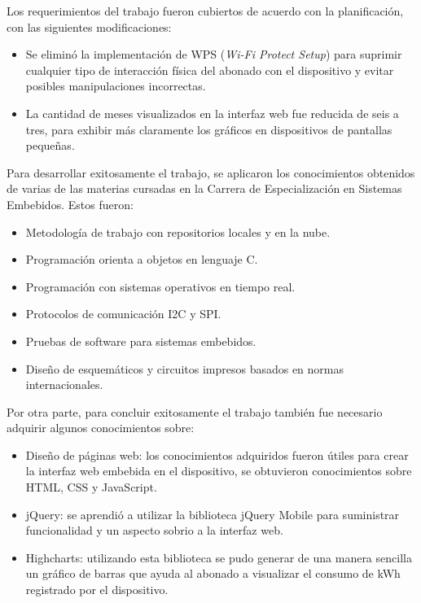 Los requerimientos del trabajo fueron cubiertos de acuerdo con la planificación, con las siguientes modificaciones:
\begin{itemize}
	\item Se eliminó la implementación de WPS (\textit{Wi-Fi Protect Setup}) para suprimir cualquier tipo de interacción física del abonado con el dispositivo y evitar posibles manipulaciones incorrectas.
	\item La cantidad de meses visualizados en la interfaz web fue reducida de seis a tres, para exhibir más claramente los gráficos en dispositivos de pantallas pequeñas.
\end{itemize}

Para desarrollar exitosamente el trabajo, se aplicaron los conocimientos obtenidos de varias de las materias cursadas en la Carrera de Especialización en Sistemas Embebidos. Estos fueron:

\begin{itemize}
	\item Metodología de trabajo con repositorios locales y en la nube.
	\item Programación orienta a objetos en lenguaje C.
	\item Programación con sistemas operativos en tiempo real.
	\item Protocolos de comunicación I2C y SPI.
	\item Pruebas de software para sistemas embebidos.
	\item Diseño de esquemáticos y circuitos impresos basados en normas internacionales.
\end{itemize}

Por otra parte, para concluir exitosamente el trabajo también fue necesario adquirir algunos conocimientos sobre:

\begin{itemize}
	\item Diseño de páginas web: los conocimientos adquiridos fueron útiles para crear la interfaz web embebida en el dispositivo, se obtuvieron conocimientos sobre HTML, CSS y JavaScript.
	\item jQuery: se aprendió a utilizar la biblioteca jQuery Mobile para suministrar funcionalidad y un aspecto sobrio a la interfaz web.
	\item Highcharts: utilizando esta biblioteca se pudo generar de una manera sencilla un gráfico de barras que ayuda al abonado a visualizar el consumo de kWh registrado por el dispositivo.
\end{itemize}

